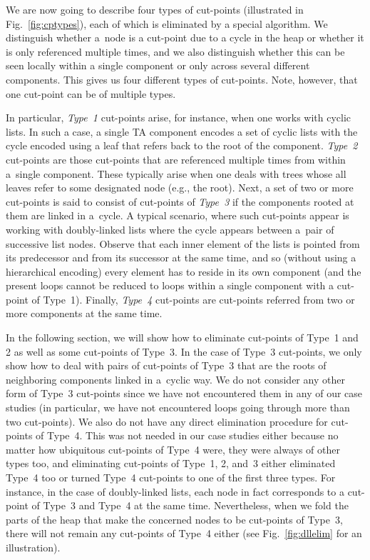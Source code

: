 We are now going to describe four types of cut-points (illustrated in
Fig.~\ref{fig:cptypes}), each of which is eliminated by a special algorithm. 
We distinguish whether a~node is a cut-point due to a cycle in the heap or whether it is only referenced multiple times, 
and we also distinguish whether this can be seen locally within a single component or only across several different components.
This gives us four different types of cut-points.
Note, however, that one cut-point can be of multiple types.

In particular, \emph{Type~1} cut-points arise, for instance, when one works with cyclic
lists. In such a case, a single TA component encodes a set of cyclic lists with the
cycle encoded using a leaf that refers back to the root of the component. \emph{Type~2}
cut-points are those cut-points that are referenced multiple times from within
a~single component. These typically arise when one deals with trees whose all leaves
refer to some designated node (e.g., the root). Next, a set of two or more cut-points
is said to consist of cut-points of \emph{Type~3} if the components rooted at them are linked
in a~cycle. A typical scenario, where such cut-points appear is working with
doubly-linked lists where the cycle appears between a~pair of successive list nodes.
Observe that each inner element of the lists is pointed from its predecessor and
from its successor at the same time, and so (without using a hierarchical encoding)
every element has to reside in its own component (and the present loops cannot be
reduced to loops within a single component with a cut-point of Type~1). Finally,
\emph{Type~4} cut-points are cut-points referred from two or more components at the
same time.

In the following section, we will show how to eliminate cut-points of Type~1 and 2
as well as some cut-points of Type~3. In the case of Type~3 cut-points, 
we only show how to deal with pairs of cut-points of Type~3 that are the roots of neighboring components linked
in a~cyclic way.
We do not consider any other form of Type~3 cut-points since we have not
encountered them in any of our case studies (in particular, we have not
encountered loops going through more than two cut-points).
We also do not have any direct elimination procedure for cut-points of Type~4.
This was not needed in our case studies either because no matter how
ubiquitous cut-points of Type~4 were, they were always of other types too, and
eliminating cut-points of Type~1, 2, and~3 either eliminated Type~4 too or
turned Type~4 cut-points to one of the first three types.
For instance, in the case of doubly-linked lists, each node in fact
corresponds to a cut-point of Type~3 and Type~4 at the same time. Nevertheless, when
we fold the parts of the heap that make the concerned nodes to be cut-points of
Type~3, there will not remain any cut-points of Type~4 either (see
Fig.~\ref{fig:dllelim} for an illustration). 

